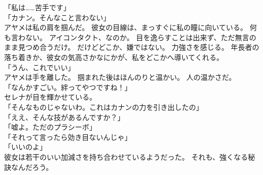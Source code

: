 \documentclass[../IHMain]{subfiles}
\begin{document}
「私は……苦手です」\\
「カナン。そんなこと言わない」\\
アヤメは私の肩を掴んだ。
彼女の目線は、まっすぐに私の瞳に向いている。
何も言わない。
アイコンタクト、なのか。
目を逸らすことは出来ず、ただ無言のまま見つめ合うだけ。
だけどどこか、嫌ではない。
力強さを感じる。
年長者の落ち着きか、彼女の気高さかなにかが、私をどこかへ導いてくれる。\\
「うん、これでいい」\\
アヤメは手を離した。
掴まれた後はほんのりと温かい。
人の温かさだ。\\
「なんかすごい。絆ってやつですね！」\\
セレナが目を輝かせている。\\
「そんなものじゃないわ。これはカナンの力を引き出したの」\\
「ええ、そんな技があるんですか？」\\
「嘘よ。ただのプラシーボ」\\
「それって言ったら効き目ないんじゃ」\\
「いいのよ」\\
彼女は若干のいい加減さを持ち合わせているようだった。
それも、強くなる秘訣なんだろう。
\end{document}
